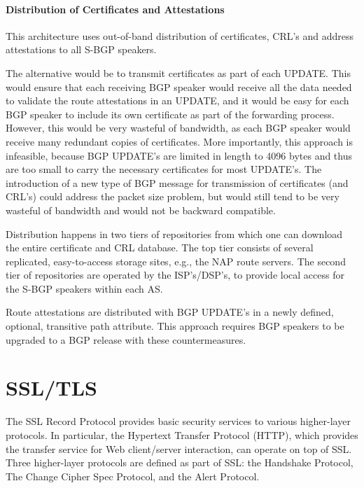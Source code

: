 \documentclass[12pt]{article}
\begin{document}
\paragraph*{Distribution of Certificates and Attestations}
This architecture uses out-of-band distribution of certificates, CRL’s and address attestations to all S-BGP speakers. 

The alternative would be to transmit certificates as part of each UPDATE. This would ensure that each receiving BGP speaker would receive all the data needed to validate the route attestations in an UPDATE, and it would be easy
for each BGP speaker to include its own certificate as part of
the forwarding process. However, this would be very wasteful of
bandwidth, as each BGP speaker would receive many redundant
copies of certificates. More importantly, this approach is infeasible, because BGP UPDATE’s are limited in length to 4096
bytes and thus are too small to carry the necessary certificates
for most UPDATE’s.
The introduction of a new type of BGP
message for transmission of certificates (and CRL’s) could address the packet size problem, but would still tend to be very
wasteful of bandwidth and would not be backward compatible. 

Distribution happens in two tiers
of repositories from which one can download the entire certificate and CRL database. The top tier consists of several replicated, easy-to-access storage sites, e.g., the NAP route servers.
The second tier of repositories are operated by the ISP’s/DSP’s,
to provide local access for the S-BGP speakers within each
AS.

Route attestations are
distributed with BGP UPDATE’s in a newly defined, optional,
transitive path attribute. This approach requires BGP speakers
to be upgraded to a BGP release with these countermeasures.

\section{SSL/TLS}
The SSL Record Protocol provides basic security services to various higher-layer protocols. In particular, the Hypertext Transfer Protocol (HTTP), which provides the transfer service for Web client/server interaction, can operate on top of SSL. Three higher-layer protocols are defined as part of SSL: the Handshake Protocol, The Change Cipher Spec Protocol, and the Alert Protocol. 
\end{document}
